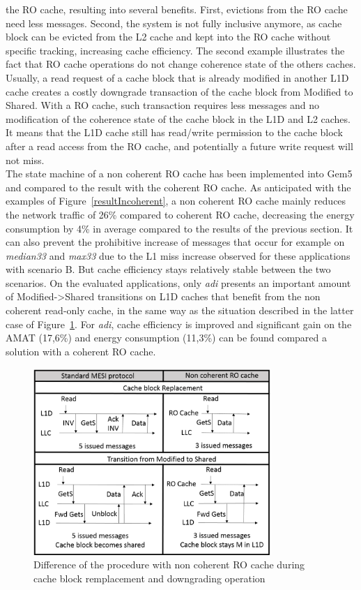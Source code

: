 \documentclass[sigconf]{acmart}
\begin{document}
the RO cache, resulting into several benefits. First, evictions from
the RO cache need less messages. Second, the system is not fully
inclusive anymore, as cache block can be evicted from the L2 cache and
kept into the RO cache without specific tracking, increasing
cache efficiency. The second example illustrates the fact that RO
cache operations do not change coherence state of the others
caches. Usually, a read request of a cache block that is already
modified in another L1D cache creates a costly downgrade transaction
of the cache block from Modified to Shared. With a RO cache, such
transaction requires less messages and no modification of the
coherence state of the cache block in the L1D and L2 caches. It means
that the L1D cache still has read/write permission to the cache block
after a read access from the RO cache, and potentially a future write
request will not miss. \\
\indent The state machine of a non coherent RO cache has been implemented into Gem5 and compared to the result with the coherent RO cache. As anticipated with the examples of Figure~\ref{resultIncoherent}, a non
coherent RO cache mainly reduces the network traffic of 26\% compared
to coherent RO cache, decreasing the energy consumption by 4\% in average compared to the results of the previous section. It can also
prevent the prohibitive increase of messages that occur for example on
\textit{median33} and \textit{max33} due to the L1 miss
increase observed for these applications with scenario B. But cache
efficiency stays relatively stable between the two scenarios. On the
evaluated applications, only \textit{adi} presents an important amount
of Modified->Shared transitions on L1D caches that benefit from the
non coherent read-only cache, in the same way as the situation
described in the latter case of Figure~\ref{incoherent}. For
\textit{adi}, cache efficiency is improved and significant gain on the
AMAT (17,6\%) and energy consumption (11,3\%) can be found compared a
solution with a coherent RO cache.

\begin{figure}
    \centering
    \includegraphics[width=9cm]{./images/incoherent.png}
    \caption{Difference of the procedure with non coherent RO cache during  cache block remplacement and downgrading operation}
    \label{incoherent}
\end{figure}
\end{document}
